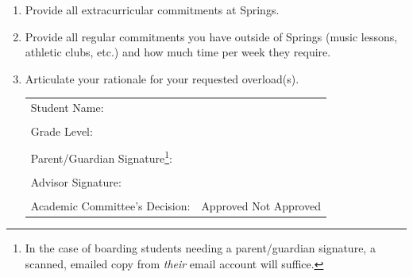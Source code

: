  
 
 
 
 
 
 
\begin{enumerate}
  \item Provide all extracurricular commitments at Springs.
  
  \vfill
  
  \item Provide all regular commitments you have outside of Springs (music lessons, athletic clubs, etc.) and how much time per week they require.
  
  \vfill
  
  \item Articulate your rationale for your requested overload(s).
  
  \vfill
  
  
  
  
  \vfill
  \noindent\hrulefill
  \vspace{.5cm}

  \renewcommand{\arraystretch}{1}
  \noindent\begin{tabular}{ll}
  Student Name: & \underline{\hspace{7cm}}\\
  &\\
  Grade Level:  & \underline{\hspace{7cm}}\\
  &\\
  Parent/Guardian Signature\footnote{In the case of boarding students needing a parent/guardian signature, a scanned, emailed copy from \emph{their} email account will suffice.}: & \underline{\hspace{7cm}}\\
  &\\
  Advisor Signature:  & \underline{\hspace{7cm}}\\
  &\\
  Academic Committee’s Decision:	& Approved  \hspace{.5cm} 	Not Approved
  \end{tabular}
\end{enumerate} 






































